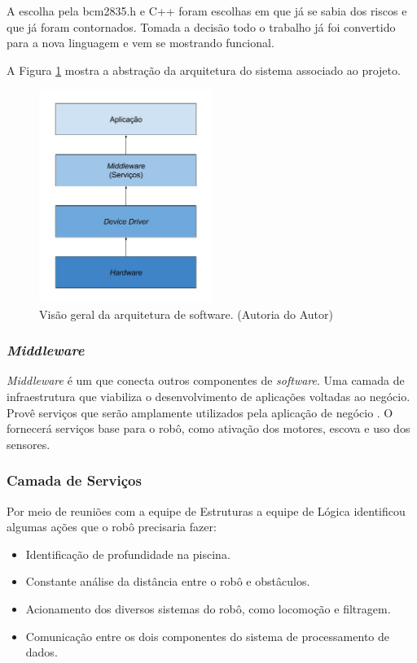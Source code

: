 A escolha pela \textsf{bcm2835.h} e C++ foram escolhas em que já se sabia dos riscos e que já foram contornados. Tomada a decisão todo o trabalho já foi convertido para a nova linguagem e vem se mostrando funcional.

A Figura \ref{fig:schema-arch} mostra a abstração da arquitetura do sistema associado ao projeto.
\par
\begin{figure}[h]
  \centering
  \includegraphics[width=0.5\textwidth]{figures/schema-arch.jpg}
  \caption{Visão geral da arquitetura de software. (\textsf{Autoria do Autor)}}
  \label{fig:schema-arch}
\end{figure}
\FloatBarrier
\par

\subsubsection{\textit{Middleware}}
\textit{Middleware} é um \software que conecta outros componentes de \textit{software}. Uma camada de infraestrutura que viabiliza o desenvolvimento de aplicações voltadas ao negócio. Provê serviços que serão amplamente utilizados pela aplicação de negócio \cite{oracle2016}. O \middleware fornecerá serviços base para o robô, como ativação dos motores, escova e uso dos sensores.

\subsubsection{Camada de Serviços}
Por meio de reuniões com a equipe de Estruturas a equipe de Lógica identificou algumas ações que o robô precisaria fazer:
\begin{itemize}
\item Identificação de profundidade na piscina.
\item Constante análise da distância entre o robô e obstâculos.
\item Acionamento dos diversos sistemas do robô, como locomoção e filtragem.
\item Comunicação entre os dois componentes do sistema de processamento de dados.
\end{itemize}

